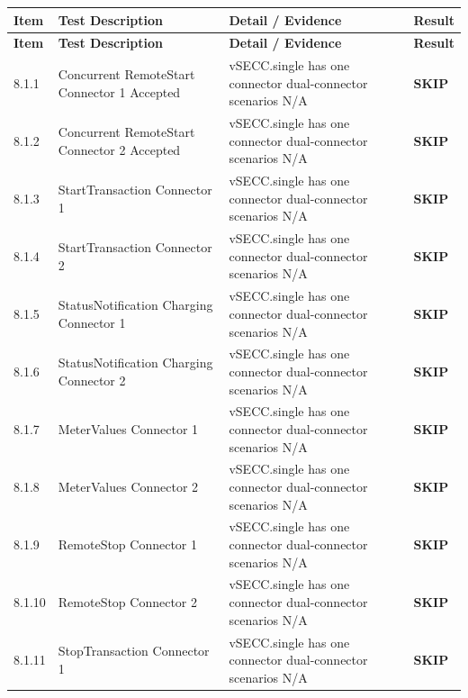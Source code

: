 \documentclass[10pt, a4paper]{article}
\begin{document}
\renewcommand{\arraystretch}{1.35}
\begin{longtable}{|L{1cm}|L{5.5cm}|M{7cm}|C{1.8cm}|}
\hline
{}
\textbf{Item} & \small\textbf{Test Description} & \small\textbf{Detail / Evidence} & \small\textbf{Result} \\
\hline
\endfirsthead
\hline
{}
\textbf{Item} & \small\textbf{Test Description} & \small\textbf{Detail / Evidence} & \small\textbf{Result} \\
\hline
\endhead
\hline
\endfoot
\small 8.1.1 & \small Concurrent RemoteStart  Connector 1 Accepted & vSECC.single has one connector  dual-connector scenarios N/A & \textcolor{skipgray}{\textbf{SKIP}} \\
\hline
\small 8.1.2 & \small Concurrent RemoteStart  Connector 2 Accepted & vSECC.single has one connector  dual-connector scenarios N/A & \textcolor{skipgray}{\textbf{SKIP}} \\
\hline
\small 8.1.3 & \small StartTransaction  Connector 1 & vSECC.single has one connector  dual-connector scenarios N/A & \textcolor{skipgray}{\textbf{SKIP}} \\
\hline
\small 8.1.4 & \small StartTransaction  Connector 2 & vSECC.single has one connector  dual-connector scenarios N/A & \textcolor{skipgray}{\textbf{SKIP}} \\
\hline
\small 8.1.5 & \small StatusNotification Charging  Connector 1 & vSECC.single has one connector  dual-connector scenarios N/A & \textcolor{skipgray}{\textbf{SKIP}} \\
\hline
\small 8.1.6 & \small StatusNotification Charging  Connector 2 & vSECC.single has one connector  dual-connector scenarios N/A & \textcolor{skipgray}{\textbf{SKIP}} \\
\hline
\small 8.1.7 & \small MeterValues  Connector 1 & vSECC.single has one connector  dual-connector scenarios N/A & \textcolor{skipgray}{\textbf{SKIP}} \\
\hline
\small 8.1.8 & \small MeterValues  Connector 2 & vSECC.single has one connector  dual-connector scenarios N/A & \textcolor{skipgray}{\textbf{SKIP}} \\
\hline
\small 8.1.9 & \small RemoteStop  Connector 1 & vSECC.single has one connector  dual-connector scenarios N/A & \textcolor{skipgray}{\textbf{SKIP}} \\
\hline
\small 8.1.10 & \small RemoteStop  Connector 2 & vSECC.single has one connector  dual-connector scenarios N/A & \textcolor{skipgray}{\textbf{SKIP}} \\
\hline
\small 8.1.11 & \small StopTransaction  Connector 1 & vSECC.single has one connector  dual-connector scenarios N/A & \textcolor{skipgray}{\textbf{SKIP}} \\

\end{longtable}
\end{document}
